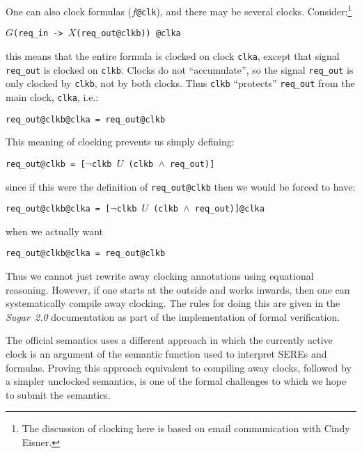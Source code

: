 \documentclass{llncs}
\newcommand\Sugar{{\it{Sugar~2.0}}\xspace}
\begin{document}
One can also clock formulas (\texttt{$f$@clk}), and there may be
several clocks. Consider:\footnote{The discussion of clocking here is based on email communication
with Cindy Eisner.}

\medskip

\texttt{$G$(req\_in -> $X$(req\_out@clkb)) @clka}

\medskip

\noindent this means that the entire formula is clocked on
clock \texttt{clka}, except that signal \texttt{req\_out} is clocked on \texttt{clkb}. 
Clocks do not ``accumulate'', so
the signal \texttt{req\_out} is only clocked by \texttt{clkb}, not by both clocks.  
Thus \texttt{clkb} ``protects''
\texttt{req\_out} from the main clock, \texttt{clka}, i.e.:

\medskip

\texttt{req\_out@clkb@clka = req\_out@clkb}

\medskip

\noindent This meaning of clocking prevents us simply defining:

\medskip

\texttt{req\_out@clkb = [$\neg$clkb $U$ (clkb $\wedge$ req\_out)]}

\medskip

\noindent since if this were the definition of \texttt{req\_out@clkb}
then we would be forced to have:

\medskip

\texttt{req\_out@clkb@clka = [$\neg$clkb $U$ (clkb $\wedge$ req\_out)]@clka}

\medskip

\noindent when we actually want

\medskip

\texttt{req\_out@clkb@clka = req\_out@clkb}

\medskip

Thus we cannot just rewrite away clocking annotations using 
equational reasoning. However, if one starts at the outside and works
inwards, then one can systematically compile away clocking. The rules
for doing this are given in the \Sugar documentation as part of the
implementation of formal verification.

The official semantics uses a different approach in which the
currently active clock is an argument of the semantic function used
to interpret SEREs and formulas.  Proving this approach equivalent to
compiling away clocks, followed by a simpler unclocked semantics, is
one of the formal challenges to which we hope to submit the semantics.
\end{document}

